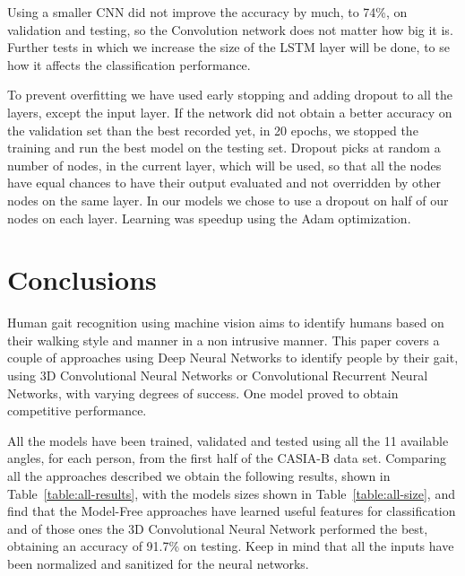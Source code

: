 \documentclass[12pt]{article}
\theoremstyle{definition}
\begin{document}
	Using a smaller CNN did not improve the accuracy by much, to 74\%, on validation and testing, so the Convolution network does not matter how big it is. Further tests in which we increase the size of the LSTM layer will be done, to se how it affects the classification performance.

	To prevent overfitting we have used early stopping and adding dropout to all the layers, except the input layer. If the network did not obtain a better accuracy on the validation set than the best recorded yet, in 20 epochs, we stopped the training and run the best model on the testing set. Dropout picks at random a number of nodes, in the current layer, which will be used, so that all the nodes have equal chances to have their output evaluated and not overridden by other nodes on the same layer. In our models we chose to use a dropout on half of our nodes on each layer. Learning was speedup using the Adam optimization.

	\clearpage

	\section{Conclusions}
	\vspace{1cm}

	Human gait recognition using machine vision aims to identify humans based on their walking style and manner in a non intrusive manner. This paper covers a couple of approaches using Deep Neural Networks to identify people by their gait, using 3D Convolutional Neural Networks or Convolutional Recurrent Neural Networks, with varying degrees of success. One model proved to obtain competitive performance.

	All the models have been trained, validated and tested using all the 11 available angles, for each person, from the first half of the CASIA-B data set. Comparing all the approaches described we obtain the following results, shown in Table~\ref{table:all-results}, with the models sizes shown in Table~\ref{table:all-size}, and find that the Model-Free approaches have learned useful features for classification and of those ones the 3D Convolutional Neural Network performed the best, obtaining an accuracy of 91.7\% on testing. Keep in mind that all the inputs have been normalized and sanitized for the neural networks.
\end{document}
